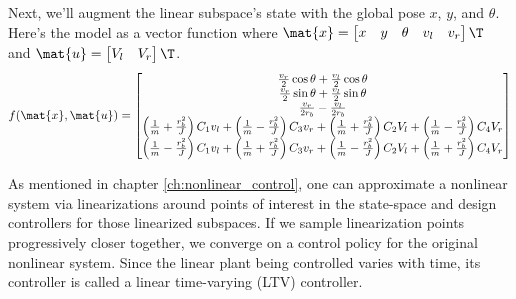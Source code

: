 Next, we'll augment the linear subspace's state with the global pose $x$, $y$,
and $\theta$. Here's the model as a vector function where
$\mat{x} = \begin{bmatrix} x & y & \theta & v_l & v_r \end{bmatrix}\T$ and
$\mat{u} = \begin{bmatrix} V_l & V_r \end{bmatrix}\T$.
\begin{equation}
  f(\mat{x}, \mat{u}) =
  \begin{bmatrix}
    \frac{v_r}{2}\cos\theta + \frac{v_l}{2}\cos\theta \\
    \frac{v_r}{2}\sin\theta + \frac{v_l}{2}\sin\theta \\
    \frac{v_r}{2r_b} - \frac{v_l}{2r_b} \\
    \left(\frac{1}{m} + \frac{r_b^2}{J}\right) C_1 v_l +
      \left(\frac{1}{m} - \frac{r_b^2}{J}\right) C_3 v_r +
      \left(\frac{1}{m} + \frac{r_b^2}{J}\right) C_2 V_l +
      \left(\frac{1}{m} - \frac{r_b^2}{J}\right) C_4 V_r \\
    \left(\frac{1}{m} - \frac{r_b^2}{J}\right) C_1 v_l +
      \left(\frac{1}{m} + \frac{r_b^2}{J}\right) C_3 v_r +
      \left(\frac{1}{m} - \frac{r_b^2}{J}\right) C_2 V_l +
      \left(\frac{1}{m} + \frac{r_b^2}{J}\right) C_4 V_r
  \end{bmatrix}
  \label{eq:ltv_diff_drive_f}
\end{equation}

As mentioned in chapter \ref{ch:nonlinear_control}, one can approximate a
nonlinear system via linearizations around points of interest in the state-space
and design controllers for those linearized subspaces. If we sample
linearization points progressively closer together, we converge on a control
policy for the original nonlinear system. Since the linear \gls{plant} being
controlled varies with time, its controller is called a linear time-varying
(LTV) controller.

